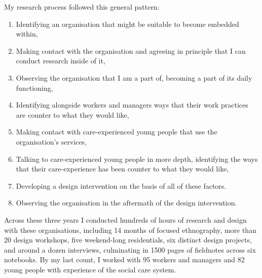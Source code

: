 My research process followed this general pattern:
\begin{enumerate}
\item Identifying an organisation that might be suitable to become embedded within,
\item Making contact with the organisation and agreeing in principle that I can conduct research inside of it,
\item Observing the organisation that I am a part of, becoming a part of its daily functioning,
\item Identifying alongside workers and managers ways that their work practices are counter to what they would like,
\item Making contact with care-experienced young people that use the organisation's services,
\item Talking to care-experienced young people in more depth, identifying the ways that their care-experience has been counter to what they would like,
\item Developing a design intervention on the basis of all of these factors.
\item Observing the organisation in the aftermath of the design intervention.
\end{enumerate}

Across these three years I conducted hundreds of hours of research and design with these organisations, including 14 months of focused ethnography, more than 20 design workshops, five weekend-long residentials, six distinct design projects, and around a dozen interviews, culminating in 1500 pages of fieldnotes across six notebooks. By my last count, I worked with 95 workers and managers and 82 young people with experience of the social care system. 

